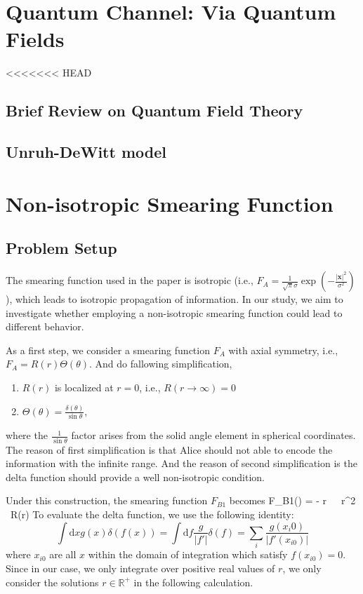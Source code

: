 \documentclass[a4paper,12pt]{article}
\begin{document}
\section{Quantum Channel: Via Quantum Fields}
<<<<<<< HEAD
\subsection{Brief Review on Quantum Field Theory}
\subsection{Unruh-DeWitt model}

\section{Non-isotropic Smearing Function}
\subsection{Problem Setup}
The smearing function used in the paper is isotropic (i.e., $F_A = \frac{1}{\sqrt{\pi}\sigma} \exp\left(-\frac{|\mathbf{x}|^2}{\sigma^2}\right)$), which leads to isotropic propagation of information. In our study, we aim to investigate whether employing a non-isotropic smearing function could lead to different behavior.

As a first step, we consider a smearing function $F_A$ with axial symmetry, i.e., $F_A = R(r)\Theta(\theta)$.
And do fallowing simplification, 
\begin{enumerate}
  \item $R(r)$ is localized at $r = 0$, i.e., $R(r \rightarrow \infty) = 0$
  \item $\Theta(\theta) = \frac{\delta(\theta)}{\sin{\theta}}$,
\end{enumerate}
where the $\frac{1}{\sin\theta}$ factor arises from the solid angle element in spherical coordinates.
The reason of first simplification is that Alice should not able to encode the information with the infinite range. And the reason of second simplification is the delta function should provide a well non-isotropic condition.

Under this construction, the smearing function $F_{B1}$ becomes
\be
    F_{B1}() = - \int {}r\, \theta\, \phi\, r^2 \sin{\theta} \, R(r)\frac{\delta(\theta)}{\sin{\theta}} 
\ee
To evaluate the delta function, we use the following identity:
\[
    \int \mathrm{d}x g(x) \delta(f(x)) = \int \mathrm{d}f \frac{g}{\left|f'\right|} \delta(f) = \sum_i\frac{g(x_i0)}{\left|f'(x_{i0})\right|}
\]
where $x_{i0}$ are all $x$ within the domain of integration which satisfy $f(x_{i0}) = 0$. Since in our case, we only integrate over positive real values of $r$, we only consider the solutions $r \in \mathbb{R}^+$ in the following calculation.
\end{document}
